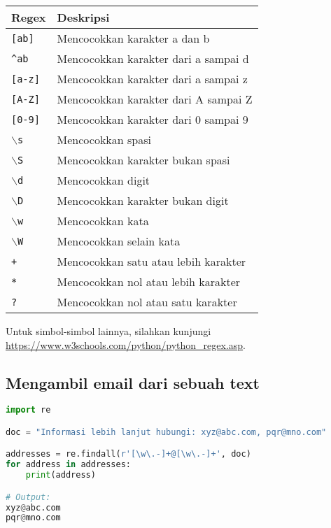 \documentclass{article}
\begin{document}
    \begin{longtable}[c]{p{2cm}|p{8cm}}
        \hline
        \textbf{Regex} & \textbf{Deskripsi} \\
        \hline
        
        \texttt{[ab]} & Mencocokkan karakter a dan b \\
        \texttt{\textasciicircum ab} & Mencocokkan karakter dari a sampai d \\
        \texttt{[a-z]} & Mencocokkan karakter dari a sampai z \\
        \texttt{[A-Z]} & Mencocokkan karakter dari A sampai Z \\
        \texttt{[0\@-9]} & Mencocokkan karakter dari 0 sampai 9 \\
        \texttt{$\backslash$s} & Mencocokkan spasi \\
        \texttt{$\backslash$S} & Mencocokkan karakter bukan spasi \\
        \texttt{$\backslash$d} & Mencocokkan digit \\
        \texttt{$\backslash$D} & Mencocokkan karakter bukan digit \\
        \texttt{$\backslash$w} & Mencocokkan kata \\
        \texttt{$\backslash$W} & Mencocokkan selain kata \\
        \texttt{+} & Mencocokkan satu atau lebih karakter \\
        \texttt{*} & Mencocokkan nol atau lebih karakter \\
        \texttt{?} & Mencocokkan nol atau satu karakter \\
        \hline
    \end{longtable}

    \begin{flushleft}
        Untuk simbol-simbol lainnya, silahkan kunjungi \\
    \href{https://www.w3schools.com/python/python\_regex.asp}{https://www.w3schools.com/python/python\_regex.asp}.
    \end{flushleft}

    \subsection*{Mengambil email dari sebuah text}

    \begin{lstlisting}[language=python, style=pythonstyle]
import re

doc = "Informasi lebih lanjut hubungi: xyz@abc.com, pqr@mno.com"

addresses = re.findall(r'[\w\.-]+@[\w\.-]+', doc)
for address in addresses:
    print(address)

# Output:
xyz@abc.com
pqr@mno.com
\end{lstlisting}
\end{document}
